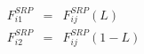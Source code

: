 \documentclass[12pt]{article}
\begin{document}
\begin{eqnarray*}
 F_{i1}^{SRP} & = & F^{SRP}_{ij}(L) \\
 F_{i2}^{SRP} & = & F^{SRP}_{ij}(1-L)  
\end{eqnarray*}                           
\end{document}
